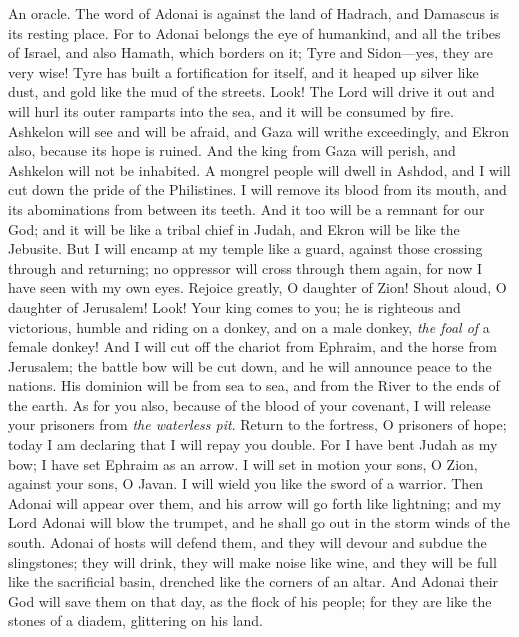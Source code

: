 \begin{biblechapter} %
\verse An oracle. The word of Adonai is against the land of Hadrach,
\verse and Damascus is its resting place. 
For to Adonai belongs the eye of humankind, 
and all the tribes of Israel,
\verse and also Hamath, which borders on it; 
Tyre and Sidon—yes, they are very wise!
\verse Tyre has built a fortification for itself, 
and it heaped up silver like dust, 
and gold like the mud of the streets.
\verse Look! The Lord will drive it out 
and will hurl its outer ramparts into the sea, 
and it will be consumed by fire.
\verse Ashkelon will see and will be afraid, 
and Gaza will writhe exceedingly, 
and Ekron also, because its hope is ruined. 
And the king from Gaza will perish, 
and Ashkelon will not be inhabited.
\verse A mongrel people will dwell in Ashdod, 
and I will cut down the pride of the Philistines.
\verse I will remove its blood from its mouth, 
and its abominations from between its teeth. 
And it too will be a remnant for our God; 
and it will be like a tribal chief in Judah, 
and Ekron will be like the Jebusite.
\verse But I will encamp at my temple like a guard, 
against those crossing through and returning; 
no oppressor will cross through them again, 
for now I have seen with my own eyes.
\verse Rejoice greatly, O daughter of Zion! 
Shout aloud, O daughter of Jerusalem! 
Look! Your king comes to you; 
he is righteous and victorious, 
humble and riding on a donkey, 
and on a male donkey, \textit{the foal of} a female donkey!
\verse And I will cut off the chariot from Ephraim, 
and the horse from Jerusalem; 
the battle bow will be cut down, 
and he will announce peace to the nations. 
His dominion will be from sea to sea, 
and from the River to the ends of the earth.
\verse As for you also, because of the blood of your covenant, 
I will release your prisoners from \textit{the waterless pit}.
\verse Return to the fortress, 
O prisoners of hope; 
today I am declaring that I will repay you double.
\verse For I have bent Judah as my bow; 
I have set Ephraim as an arrow. 
I will set in motion your sons, O Zion, 
against your sons, O Javan. 
I will wield you like the sword of a warrior.
\verse Then Adonai will appear over them, 
and his arrow will go forth like lightning; 
and my Lord Adonai will blow the trumpet, 
and he shall go out in the storm winds of the south.
\verse Adonai of hosts will defend them, 
and they will devour and subdue the slingstones; 
they will drink, they will make noise like wine, 
and they will be full like the sacrificial basin, 
drenched like the corners of an altar.
\verse And Adonai their God will save them on that day, 
as the flock of his people; 
for they are like the stones of a diadem, 
glittering on his land.
\end{biblechapter}

